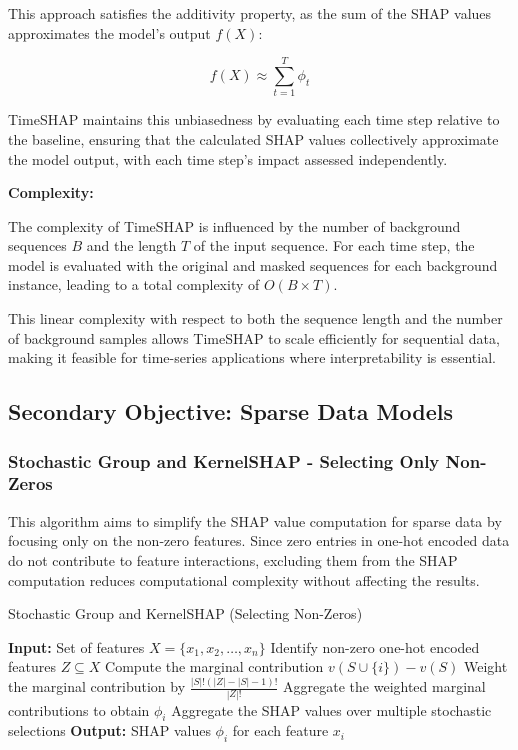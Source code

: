 This approach satisfies the additivity property, as the sum of the SHAP values approximates the model’s output \( f(X) \):

\[
f(X) \approx \sum_{t=1}^{T} \phi_t
\]

TimeSHAP maintains this unbiasedness by evaluating each time step relative to the baseline, ensuring that the calculated SHAP values collectively approximate the model output, with each time step’s impact assessed independently.

\textbf{Complexity:}

The complexity of TimeSHAP is influenced by the number of background sequences \( B \) and the length \( T \) of the input sequence. For each time step, the model is evaluated with the original and masked sequences for each background instance, leading to a total complexity of \( O(B \times T) \).

This linear complexity with respect to both the sequence length and the number of background samples allows TimeSHAP to scale efficiently for sequential data, making it feasible for time-series applications where interpretability is essential.

\subsection{Secondary Objective: Sparse Data Models}
\subsubsection{Stochastic Group and KernelSHAP - Selecting Only Non-Zeros}

This algorithm aims to simplify the SHAP value computation for sparse data by focusing only on the non-zero features. Since zero entries in one-hot encoded data do not contribute to feature interactions, excluding them from the SHAP computation reduces computational complexity without affecting the results.

\begin{algorithm}[H]
\label{algo:nonzeros}
\caption{Stochastic Group and KernelSHAP (Selecting Non-Zeros)}
\begin{algorithmic}[1]
\State \textbf{Input:} Set of features $X = \{x_1, x_2, \ldots, x_n\}$
\State Identify non-zero one-hot encoded features $Z \subseteq X$
        \State Compute the marginal contribution $v(S \cup \{i\}) - v(S)$
        \State Weight the marginal contribution by $\frac{|S|!(|Z| - |S| - 1)!}{|Z|!}$
    \EndFor
    \State Aggregate the weighted marginal contributions to obtain $\phi_i$
\EndFor
\State Aggregate the SHAP values over multiple stochastic selections
\State \textbf{Output:} SHAP values $\phi_i$ for each feature $x_i$
\end{algorithmic}
\end{algorithm}

